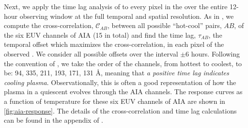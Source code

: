 Next, we apply the time lag analysis of \citet{viall_evidence_2012} to every pixel in the \AR{} over the entire 12-hour observing window at the full temporal and spatial resolution.
As in , we compute the cross-correlation, $\mathcal{C}_{AB}$, between all possible ``hot-cool'' pairs, $AB$, of the six EUV channels of AIA (15 in total) and find the time lag, $\tau_{AB}$, the temporal offset which maximizes the cross-correlation, in each pixel of the observed \AR{}.
We consider all possible offsets over the interval $\pm6$ hours.
Following the convention of \citet{viall_evidence_2012}, we take the order of the channels, from hottest to coolest, to be: 94, 335, 211, 193, 171, 131 \AA{}, meaning that \textit{a positive time lag indicates cooling plasma}.
Observationally, this is often a good representation of how the plasma in a quiescent \AR{} evolves through the AIA channels.
The response curves as a function of temperature for these six EUV channels of AIA are shown in \autoref{fig:aia-response}.
The details of the cross-correlation and time lag calculations can be found in the appendix of .

